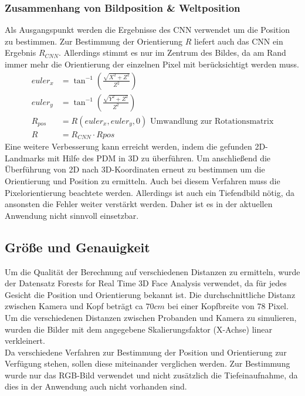 \subsubsection{Zusammenhang von Bildposition \& Weltposition}
Als Ausgangspunkt werden die Ergebnisse des CNN verwendet um die Position zu bestimmen. Zur Bestimmung der Orientierung $R$ liefert auch das CNN ein Ergebnis $R_{CNN}$. Allerdings stimmt es nur im Zentrum des Bildes, da am Rand immer mehr die Orientierung der einzelnen Pixel mit berücksichtigt werden muss.\\
\begin{align*}
euler_x &= \tan^{-1}(\frac{\sqrt{X^2+Z^2}}{Z^2})\\
euler_y &= \tan^{-1}(\frac{\sqrt{Y^2+Z^2}}{Z^2})\\
R_{pos} &= R(euler_x,euler_y,0)\text{ Umwandlung zur Rotationsmatrix}\\
R &= R_{CNN}\cdot R{pos}
\end{align*}
Eine weitere Verbesserung kann erreicht werden, indem die gefunden 2D-Landmarks mit Hilfe des PDM in 3D zu überführen. Um anschließend die Überführung von 2D nach 3D-Koordinaten erneut zu bestimmen um die Orientierung und Position zu ermitteln. Auch bei diesem Verfahren muss die Pixelorientierung beachtete werden. Allerdings ist auch ein Tiefendbild nötig, da ansonsten die Fehler weiter verstärkt werden. Daher ist es in der aktuellen Anwendung nicht sinnvoll einsetzbar.
\subsection{Größe und Genauigkeit}
Um die Qualität der Berechnung auf verschiedenen Distanzen zu ermitteln, wurde der Datensatz Forests for Real Time 3D Face Analysis \cite{database_Face_Ori} verwendet, da für jedes Gesicht die Position und Orientierung bekannt ist.
Die durchschnittliche Distanz zwischen Kamera und Kopf beträgt ca $70cm$ bei einer Kopfbreite von 78 Pixel. Um die verschiedenen Distanzen zwischen Probanden und Kamera zu simulieren, wurden die Bilder mit dem angegebene Skalierungsfaktor (X-Achse) linear verkleinert.\\
Da verschiedene Verfahren zur Bestimmung der Position und Orientierung zur Verfügung stehen, sollen diese miteinander verglichen werden. Zur Bestimmung wurde nur das RGB-Bild verwendet und nicht zusätzlich die Tiefeinaufnahme, da dies in der Anwendung auch nicht vorhanden sind.
